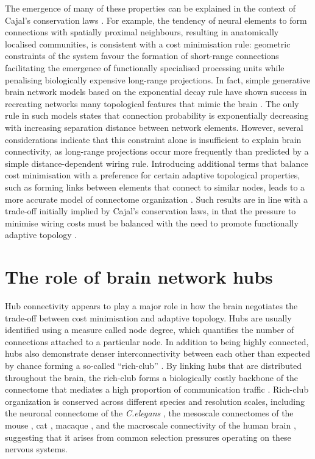 The emergence of many of these properties can be explained in the context of Cajal's conservation laws \citep{RamonyCajal1995}. For example, the tendency of neural elements to form connections with spatially proximal neighbours, resulting in anatomically localised communities, is consistent with a cost minimisation rule: geometric constraints of the system favour the formation of short-range connections facilitating the emergence of functionally specialised processing units while penalising biologically expensive long-range projections. In fact, simple generative brain network models based on the exponential decay rule have shown success in recreating networks many topological features that mimic the brain \citep{Ercsey-Ravasz2013,Henderson2014}. The only rule in such models states that connection probability is exponentially decreasing with increasing separation distance between network elements. However, several considerations indicate that this constraint alone is insufficient to explain brain connectivity, as long-range projections occur more frequently than predicted by a simple distance-dependent wiring rule. Introducing additional terms that balance cost minimisation with a preference for certain adaptive topological properties, such as forming links between elements that connect to similar nodes, leads to a more accurate model of connectome organization \citep{Betzel2016,Vertes2012}. Such results are in line with a trade-off initially implied by Cajal's conservation laws, in that the pressure to minimise wiring costs must be balanced with the need to promote functionally adaptive topology \citep{Bullmore2012}.

\section{The role of brain network hubs}

Hub connectivity appears to play a major role in how the brain negotiates the trade-off between cost minimisation and adaptive topology. Hubs are usually identified using a measure called node degree, which quantifies the number of connections attached to a particular node. In addition to being highly connected, hubs also demonstrate denser interconnectivity between each other than expected by chance forming a so-called ``rich-club'' \citep{Fulcher2016,Harriger2012,Towlson2013,VandenHeuvel2011,Zamora-Lopez2010}. By linking hubs that are distributed throughout the brain, the rich-club forms a biologically costly backbone of the connectome that mediates a high proportion of communication traffic \citep{VandenHeuvel2012,Misic2014}. Rich-club organization is conserved across different species and resolution scales, including the neuronal connectome of the \textit{C.elegans} \citep{Towlson2013}, the mesoscale connectomes of the mouse \citep{Oh2014,Fulcher2016}, cat \citep{DeReus2013b}, macaque \citep{Harriger2012}, and the macroscale connectivity of the human brain \citep{VandenHeuvel2011}, suggesting that it arises from common selection pressures operating on these nervous systems.

